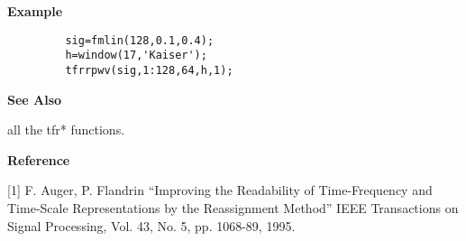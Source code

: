 
{\bf \large \sf Example}
\begin{verbatim}
         sig=fmlin(128,0.1,0.4); 
         h=window(17,'Kaiser'); 
         tfrrpwv(sig,1:128,64,h,1);
\end{verbatim}
\vspace*{.35cm}

{\bf \large \sf See Also}\\
\hspace*{1.5cm}
\begin{minipage}[t]{13.5cm}
all the {\ty tfr*} functions.
\end{minipage}
\vspace*{.35cm}
{\bf \large \sf Reference}\\
\hspace*{1.5cm}
\begin{minipage}[t]{13.5cm}
[1] F. Auger, P. Flandrin ``Improving the Readability of Time-Frequency and
Time-Scale Representations by the Reassignment Method'' IEEE Transactions
on Signal Processing, Vol. 43, No. 5, pp. 1068-89, 1995.
\end{minipage}

